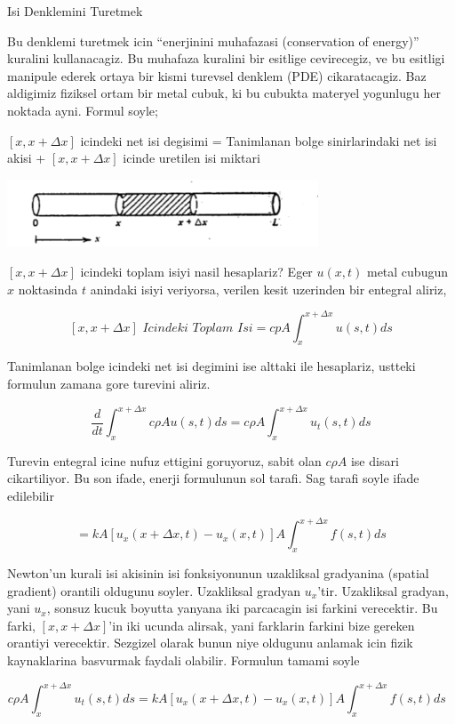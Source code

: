 \documentclass[12pt,fleqn]{article}\usepackage{../common}
\begin{document}
Isi Denklemini Turetmek 

Bu denklemi turetmek icin ``enerjinini muhafazasi (conservation of
energy)'' kuralini kullanacagiz. Bu muhafaza kuralini bir esitlige
cevirecegiz, ve bu esitligi manipule ederek ortaya bir kismi turevsel
denklem (PDE) cikaratacagiz. Baz aldigimiz fiziksel ortam bir metal cubuk,
ki bu cubukta materyel yogunlugu her noktada ayni.  Formul soyle;

$[x,x+\Delta x]$ icindeki net isi degisimi = Tanimlanan bolge
sinirlarindaki net isi akisi + $[x,x+\Delta x]$ icinde uretilen isi miktari

\includegraphics[height=2cm]{heat_1.png}

$[x,x+\Delta x]$ icindeki toplam isiyi nasil hesaplariz? Eger $u(x,t)$
metal cubugun $x$ noktasinda $t$ anindaki isiyi veriyorsa, verilen kesit
uzerinden bir entegral aliriz,

\[ [x,x+\Delta x] \textit{ Icindeki Toplam Isi} = 
cpA \int _{ x}^{x+\Delta x}u(s,t) ds
   \]

Tanimlanan bolge icindeki net isi degimini ise alttaki ile hesaplariz,
ustteki formulun zamana gore turevini aliriz. 


\[ \frac{d}{dt} \int _{ x}^{x+\Delta x} c\rho A u(s,t) ds = 
c\rho A  \int _{ x}^{x+\Delta x} u_t(s,t) ds
  \]


Turevin entegral icine nufuz ettigini goruyoruz, sabit olan $c\rho A$ ise
disari cikartiliyor. Bu son ifade, enerji formulunun sol tarafi. Sag tarafi
soyle ifade edilebilir

\[ = kA [ u_x(x+\Delta x,t) - u_x(x,t)] A \int _{x}^{x+\Delta x} f(s,t) ds \]

Newton'un kurali isi akisinin isi fonksiyonunun uzakliksal gradyanina
(spatial gradient) orantili oldugunu soyler. Uzakliksal gradyan
$u_x$'tir. Uzakliksal gradyan, yani $u_x$, sonsuz kucuk boyutta yanyana iki
parcacagin isi farkini verecektir. Bu farki, $[x,x+\Delta x]$'in iki ucunda
alirsak, yani farklarin farkini bize gereken orantiyi verecektir. Sezgizel
olarak bunun niye oldugunu anlamak icin fizik kaynaklarina basvurmak
faydali olabilir. Formulun tamami soyle

\[ c\rho A  \int _{ x}^{x+\Delta x} u_t(s,t) ds =
kA [ u_x(x+\Delta x,t) - u_x(x,t)] A \int _{x}^{x+\Delta x} f(s,t) ds 
\ \ \ \label{1}
 \]
\end{document}
